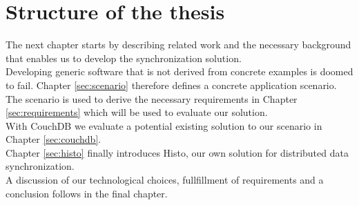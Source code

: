 \section{Structure of the thesis}
The next chapter starts by describing related work and the necessary background that enables us to develop the synchronization solution.\\
Developing generic software that is not derived from concrete examples is doomed to fail.
Chapter \ref{sec:scenario} therefore defines a concrete application scenario.\\
The scenario is used to derive the necessary requirements in Chapter \ref{sec:requirements} which will be used to evaluate our solution.\\
With CouchDB we evaluate a potential existing solution to our scenario in Chapter \ref{sec:couchdb}.\\
Chapter \ref{sec:histo} finally introduces Histo, our own solution for distributed data synchronization.\\
A discussion of our technological choices, fullfillment of requirements and a conclusion follows in the final chapter.
